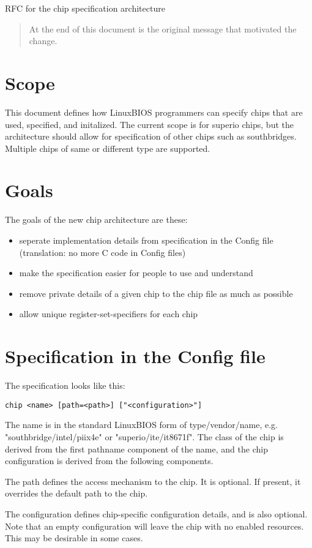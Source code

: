 		RFC for the chip specification architecture

\begin{abstract}
At the end of this document is the original message that motivated the
change. 
\end{abstract}

\section{Scope}
This document defines how LinuxBIOS programmers can specify chips that
are used, specified, and initalized. The current scope is for superio 
chips, but the architecture should allow for specification of other chips such 
as southbridges. Multiple chips of same or different type are supported. 

\section{Goals}
The goals of the new chip architecture are these: 
\begin{itemize}
\item seperate implementation details from specification in the Config file
(translation: no more C code in Config files)
\item make the specification easier for people to use and understand
\item remove private details of a given chip to the chip file as much
as possible
\item allow unique register-set-specifiers for each chip
\end{itemize}

\section{Specification in the Config file}
The specification looks like this:
\begin{verbatim}
chip <name> [path=<path>] ["<configuration>"]
\end{verbatim}
The name is in the standard LinuxBIOS form of type/vendor/name, e.g. 
"southbridge/intel/piix4e" or "superio/ite/it8671f". The class of the 
chip is derived from the first pathname component of the name, and the chip 
configuration is derived from the following components. 

The path defines the access mechanism to the chip. 
It is optional. If present, it overrides the default path to the chip. 

The configuration defines chip-specific configuration details, and is also
optional. Note that an empty configuration will leave the chip with 
no enabled resources. This may be desirable in some cases. 


